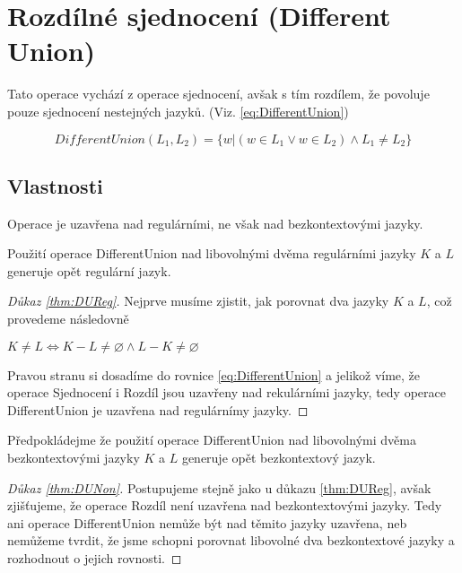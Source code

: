 \section{Rozdílné sjednocení (Different Union)}\label{se:DiferentUnion}
Tato operace vychází z operace sjednocení, avšak s tím rozdílem, že povoluje pouze sjednocení nestejných jazyků. (Viz. \ref{eq:DifferentUnion})

\begin{equation}\label{eq:DifferentUnion}
DifferentUnion(L_{1}, L_{2}) = \{w|(w\in L_{1}\lor w\in L_{2}) \land L_{1} \neq L_{2}\}
\end{equation}

\subsection{Vlastnosti}
Operace je uzavřena nad regulárními, ne však nad bezkontextovými jazyky.

\begin{theorem} \label{thm:DUReg}
Použití operace DifferentUnion nad libovolnými dvěma regulárními jazyky $K$ a $L$ generuje opět regulární jazyk.
\end{theorem}

\begin{proof}[Důkaz \ref{thm:DUReg}]
Nejprve musíme zjistit, jak porovnat dva jazyky $K$ a $L$, což provedeme následovně

$K \neq L \Longleftrightarrow K-L\neq\varnothing \land L-K\neq\varnothing$



Pravou stranu si dosadíme do rovnice \ref{eq:DifferentUnion} a jelikož víme, že operace Sjednocení i Rozdíl jsou uzavřeny nad rekulárními jazyky, tedy operace DifferentUnion je uzavřena nad regulárnímy jazyky.
\end{proof}

\begin{theorem} \label{thm:DUNon}
Předpokládejme že použití operace DifferentUnion nad libovolnými dvěma bezkontextovými jazyky $K$ a $L$ generuje opět bezkontextový jazyk.
\end{theorem}

\begin{proof}[Důkaz \ref{thm:DUNon}]
Postupujeme stejně jako u důkazu \ref{thm:DUReg}, avšak zjišťujeme, že operace Rozdíl není uzavřena nad bezkontextovými jazyky. Tedy ani operace DifferentUnion nemůže být nad těmito jazyky uzavřena, neb nemůžeme tvrdit, že jsme schopni porovnat libovolné dva bezkontextové jazyky a rozhodnout o jejich rovnosti.
\end{proof}


